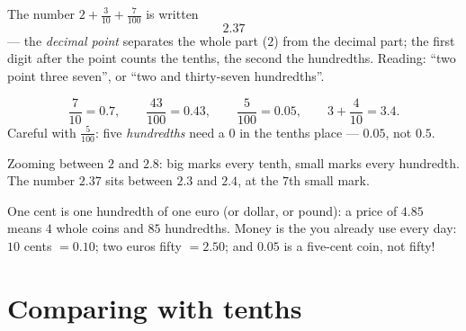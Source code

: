 \begin{definition}\label{def:g4:decimals:point}
The number $2 + \frac{3}{10} + \frac{7}{100}$ is written
\[
2.37
\]
--- the \emph{decimal point} separates the whole part ($2$) from the
decimal part; the first digit after the point counts the tenths, the
second the hundredths. Reading: ``two point three seven'', or ``two
and thirty-seven hundredths''.
\end{definition}

\begin{example}\label{ex:g4:decimals:convert}
\[
\frac{7}{10} = 0.7, \qquad
\frac{43}{100} = 0.43, \qquad
\frac{5}{100} = 0.05, \qquad
3 + \frac{4}{10} = 3.4 .
\]
Careful with $\frac{5}{100}$: five \emph{hundredths} need a $0$ in
the tenths place --- $0.05$, not $0.5$.
\end{example}

\begin{omfigure}

{\small Zooming between $2$ and $2.8$: big marks every tenth, small
marks every hundredth. The number $2.37$ sits between $2.3$ and
$2.4$, at the $7$th small mark.}
\end{omfigure}

\begin{example}\label{ex:g4:decimals:money}
One cent is one hundredth of one euro (or dollar, or pound): a price
of $4.85$ means $4$ whole coins and $85$ hundredths. Money is the
 you already use every day: $10$ cents $= 0.10$; two
euros fifty $= 2.50$; and $0.05$ is a five-cent coin, not fifty!
\end{example}

\section{Comparing with tenths}

